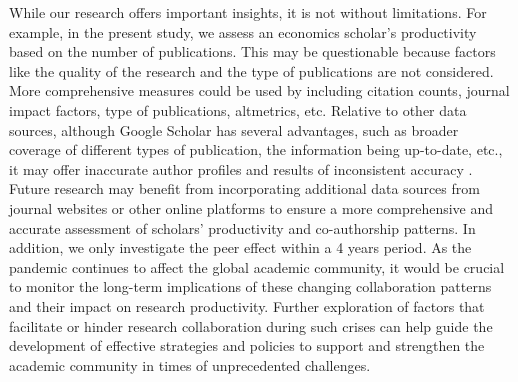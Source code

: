 While our research offers important insights, it is not without limitations. For example, in the present study, we assess an economics scholar's productivity based on the number of publications. This may be questionable because factors like the quality of the research and the type of publications are not considered. More comprehensive measures could be used by including citation counts, journal impact factors, type of publications, altmetrics, etc. Relative to other data sources, although Google Scholar has several advantages, such as broader coverage of different types of publication, the information being up-to-date, etc., it may offer inaccurate author profiles and results of inconsistent accuracy \cite{falagas2008comparison}. Future research may benefit from incorporating additional data sources from journal websites or other online platforms to ensure a more comprehensive and accurate assessment of scholars' productivity and co-authorship patterns. In addition, we only investigate the peer effect within a 4 years period. As the pandemic continues to affect the global academic community, it would be crucial to monitor the long-term implications of these changing collaboration patterns and their impact on research productivity. Further exploration of factors that facilitate or hinder research collaboration during such crises can help guide the development of effective strategies and policies to support and strengthen the academic community in times of unprecedented challenges.

\newpage
  
  



